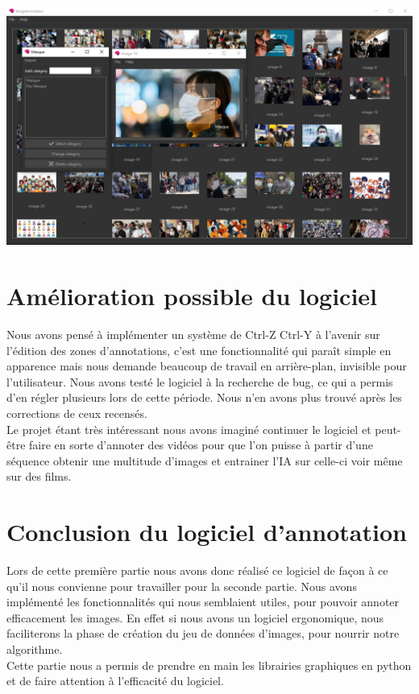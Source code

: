 \begin{center}
    \includegraphics[scale=0.3]{resources/annotation.png}
\end{center}


\section{Amélioration possible du logiciel}

Nous avons pensé à implémenter un système de Ctrl-Z Ctrl-Y à l'avenir sur l'édition des zones d'annotations, c'est une fonctionnalité qui paraît simple en apparence mais nous demande beaucoup de travail en arrière-plan, invisible pour l'utilisateur.
Nous avons testé le logiciel à la recherche de bug, ce qui a permis d'en régler plusieurs lors de cette période. Nous n'en avons plus trouvé après les corrections de ceux recensés. \\
Le projet étant très intéressant nous avons imaginé continuer le logiciel et peut-être faire en sorte d'annoter des vidéos pour que l'on puisse à partir d'une séquence obtenir une multitude d'images et entrainer l'IA sur celle-ci voir même sur des films.


\section{Conclusion du logiciel d'annotation}

Lors de cette première partie nous avons donc réalisé ce logiciel de façon à ce qu’il nous convienne pour travailler pour la seconde partie. Nous avons implémenté les fonctionnalités qui nous semblaient utiles, pour pouvoir annoter efficacement les images. En effet si nous avons un logiciel ergonomique, nous faciliterons la phase de création du jeu de données d'images, pour nourrir notre algorithme. \\

Cette partie nous a permis de prendre en main les librairies graphiques en python et de faire attention à l'efficacité du logiciel.
\newpage